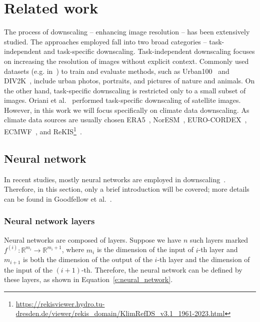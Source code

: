 \chapter{Related work}
\label{ch:related_work}

The process of downscaling -- enhancing image resolution -- has been extensively studied.
The approaches employed fall into two broad categories -- task-independent and task-specific downscaling.
Task-independent downscaling focuses on increasing the resolution of images without explicit context.
Commonly used datasets (e.g. in~\cite{Harder2023, Lim2017, Abrahamyan2022}) to train and evaluate methods, such as Urban100~\cite{Huang2015} and DIV2K~\cite{Timofte2017}, include urban photos, portraits, and pictures of nature and animals.
On the other hand, task-specific downscaling is restricted only to a small subset of images.
Oriani et al.~\cite{Oriani2021} performed task-specific downscaling of satellite images.
However, in this work we will focus specifically on climate data downscaling.
As climate data sources are usually chosen ERA5~\cite{Harder2023, Yang2024, Prasad2024, Perez2024, Sinha2025, Rocha2025}, NorESM~\cite{Harder2023, Prasad2024}, EURO-CORDEX~\cite{Jacob2014, Kostal2025}, ECMWF~\cite{Price2022}, and ReKIS\footnote{\url{https://rekisviewer.hydro.tu-dresden.de/viewer/rekis_domain/KlimRefDS_v3.1_1961-2023.html}}~\cite{Kostal2025, Quesada2023}.

\section{Neural network}

In recent studies, mostly neural networks are employed in downscaling~\cite{Prasad2024, Kostal2025}.
Therefore, in this section, only a brief introduction will be covered; more details can be found in Goodfellow et al.~\cite{Goodfellow2016}.

\subsection{Neural network layers}

Neural networks are composed of layers.
Suppose we have $n$ such layers marked $f^{(i)} \colon \mathbb{R}^{m_i} \to \mathbb{R}^{m_i + 1}$, where $m_i$ is the dimension of the input of $i$-th layer and $m_{i + 1}$ is both the dimension of the output of the $i$-th layer and the dimension of the input of the $(i + 1)$-th.
Therefore, the neural network can be defined by these layers, as shown in Equation~\eqref{e:neural_network}.


